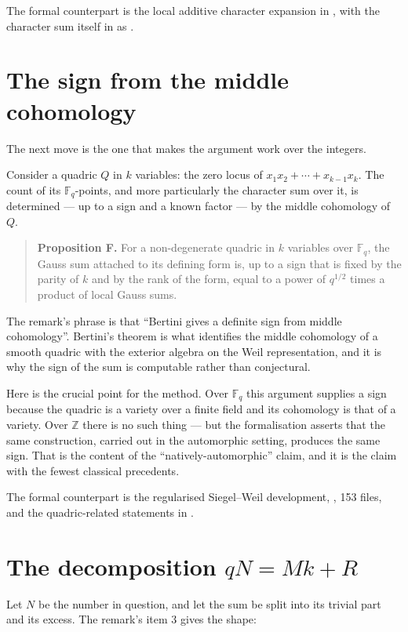 The formal counterpart is the local additive character expansion in
,
with the character sum itself in
 as .

\section{The sign from the middle cohomology}The next move is the one that makes the argument work over the integers.

Consider a quadric $Q$ in $k$ variables: the zero locus of
$x_1x_2 + \cdots + x_{k-1}x_k$. The count of its $\mathbb{F}_q$-points, and
more particularly the character sum over it, is determined --- up to a sign
and a known factor --- by the middle cohomology of $Q$.

\begin{quote}
\textbf{Proposition F.} For a non-degenerate quadric in $k$ variables over
$\mathbb{F}_q$, the Gauss sum attached to its defining form is, up to a sign
that is fixed by the parity of $k$ and by the rank of the form, equal to a
power of $q^{1/2}$ times a product of local Gauss sums.
\end{quote}

The remark's phrase is that ``Bertini gives a definite sign from middle
cohomology''. Bertini's theorem is what identifies the middle cohomology of a
smooth quadric with the exterior algebra on the Weil representation, and it
is why the sign of the sum is computable rather than conjectural.

Here is the crucial point for the method. Over $\mathbb{F}_q$ this argument
supplies a sign because the quadric is a variety over a finite field and its
cohomology is that of a variety. Over $\mathbb{Z}$ there is no such thing ---
but the formalisation asserts that the same construction, carried out in the
automorphic setting, produces the same sign. That is the content of the
``natively-automorphic'' claim, and it is the claim with the fewest classical
precedents.

The formal counterpart is the regularised Siegel--Weil development,
,
153 files, and the quadric-related statements in
.

\section{The decomposition \texorpdfstring{$qN = Mk + R$}{qN = Mk + R}}Let $N$ be the number in question, and let the sum be split into its trivial
part and its excess. The remark's item 3 gives the shape:

